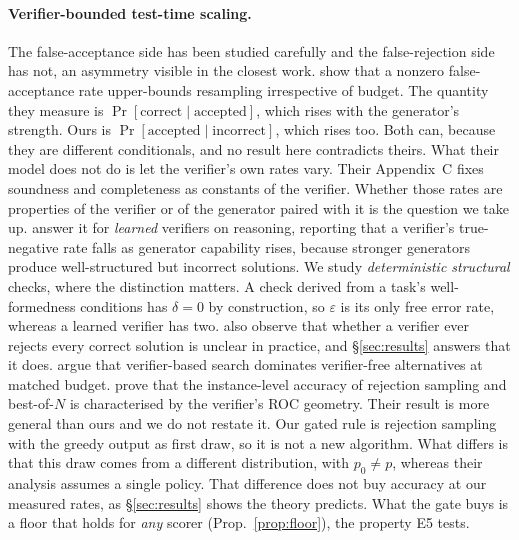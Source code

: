 \documentclass[11pt]{article}
\begin{document}
\paragraph{Verifier-bounded test-time scaling.} The false-acceptance side has
been studied carefully and the false-rejection side has not, an asymmetry visible
in the closest work. \citet{stroebl2024verifier} show that a nonzero
false-acceptance rate upper-bounds resampling irrespective of budget. The quantity they measure is $\Pr[\text{correct}\mid\text{accepted}]$,
which rises with the generator's strength. Ours is
$\Pr[\text{accepted}\mid\text{incorrect}]$, which rises too. Both can, because
they are different conditionals, and no result here contradicts theirs. What
their model does not do is let the verifier's own rates vary. Their Appendix~C
fixes soundness and completeness as constants of the verifier. Whether those
rates are properties of the verifier or of the generator paired with it is the
question we take up. \citet{variationverif2026} answer it for \emph{learned}
verifiers on reasoning, reporting that a verifier's true-negative rate falls as
generator capability rises, because stronger generators produce well-structured
but incorrect solutions. We study \emph{deterministic structural} checks, where the distinction matters.
A check derived from a task's well-formedness
conditions has $\delta=0$ by construction, so $\varepsilon$ is its only free
error rate, whereas a learned verifier has two. \citet{stroebl2024verifier} also
observe that
whether a verifier ever rejects every correct solution is unclear in practice,
and \S\ref{sec:results} answers that it does.
\citet{setlur2025vbvf} argue that verifier-based search dominates verifier-free
alternatives at matched budget. \citet{dorner2025rocnreroll} prove that the
instance-level accuracy of rejection sampling and best-of-$N$ is characterised by
the verifier's ROC geometry. Their result is more general than ours and we do not
restate it. Our gated rule is rejection sampling with the greedy output as first draw, so it
is not a new algorithm. What differs is that this draw comes from a different
distribution, with $p_0\neq p$, whereas their analysis assumes a single policy.
That difference does not buy accuracy at our measured rates, as
\S\ref{sec:results} shows the theory predicts. What the gate buys is a floor that
holds for \emph{any} scorer (Prop.~\ref{prop:floor}), the property E5 tests.
\end{document}
